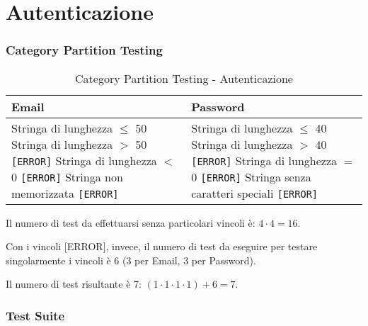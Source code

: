 
\section{Autenticazione}
\subsubsection*{Category Partition Testing}
\begin{table}[H]
    \centering
    \footnotesize
    \renewcommand{\arraystretch}{1.5}
    \begin{tabular}{|p{6cm}|p{6cm}|}
       \hline
       \textbf{Email} & \textbf{Password} \\
       \hline
       Stringa di lunghezza $\leq$ 50 \newline
       Stringa di lunghezza $>$ 50 \texttt{[ERROR]} \newline
       Stringa di lunghezza $<$ 0 \texttt{[ERROR]} \newline
       Stringa non memorizzata \texttt{[ERROR]} &

       Stringa di lunghezza $\leq$ 40 \newline
       Stringa di lunghezza $>$ 40 \texttt{[ERROR]} \newline
       Stringa di lunghezza $=$ 0 \texttt{[ERROR]} \newline
       Stringa senza caratteri speciali \texttt{[ERROR]} \\
       \hline
    \end{tabular}
    \caption{Category Partition Testing - Autenticazione}
\end{table}

\noindent Il numero di test da effettuarsi senza particolari vincoli è: $4 \cdot 4 = 16$.

\noindent Con i vincoli [ERROR], invece, il numero di test da eseguire per testare singolarmente i vincoli è 6 (3 per Email, 3 per Password).

\noindent Il numero di test risultante è 7: $(1 \cdot 1 \cdot 1 \cdot 1) + 6 = 7$.

\subsubsection*{Test Suite}

